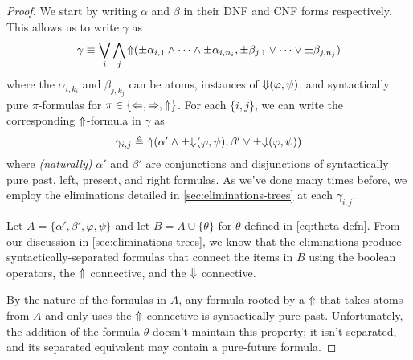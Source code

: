 \documentclass[a4paper,UKenglish,cleveref, autoref, thm-restate, numberwithinsect]{lipics-v2021}
\def\Larrow{\ensuremath\mathord{\Leftarrow}}
\def\Rarrow{\ensuremath\mathord{\Rightarrow}}
\def\Uarrow{\ensuremath\mathord{\Uparrow}}
\def\Darrow{\ensuremath\mathord{\Downarrow}}
\begin{document}
\begin{proof}
    We start by writing $\alpha$ and $\beta$ in their DNF and CNF forms respectively. This allows us to write $\gamma$ as
    \begin{equation*}
        \gamma \equiv \bigvee_i \bigwedge_j \Uarrow( \pm \alpha_{i, 1} \land \cdots \land \pm \alpha_{i, n_i}, \pm \beta_{j, 1} \lor \cdots \lor \pm \beta_{j, n_j})
    \end{equation*}
    where the $\alpha_{i, k_i}$ and $\beta_{j, k_j}$ can be atoms, instances of $\Darrow(\varphi, \psi)$, and syntactically pure $\pi$-formulas for $\pi \in \{\Larrow, \Rarrow, \Uarrow\}$. For each $\{i, j\}$, we can write the corresponding $\Uarrow$-formula in $\gamma$ as
    \begin{equation*}
        \gamma_{i, j} \triangleq \Uarrow(\alpha' \land \pm \Darrow(\varphi, \psi), \beta' \lor \pm \Darrow(\varphi, \psi))
    \end{equation*}
    where \textit{(naturally)} $\alpha'$ and $\beta'$ are conjunctions and disjunctions of syntactically pure past, left, present, and right formulas. As we've done many times before, we employ the eliminations detailed in \cref{sec:eliminations-trees} at each $\gamma_{i, j}$.

    Let $A = \{\alpha', \beta', \varphi, \psi\}$ and let $B = A \cup \{\theta\}$ for $\theta$ defined in \cref{eq:theta-defn}. From our discussion in \cref{sec:eliminations-trees}, we know that the eliminations produce syntactically-separated formulas that connect the items in $B$ using the boolean operators, the $\Uarrow$ connective, and the $\Darrow$ connective.

    By the nature of the formulas in $A$, any formula rooted by a $\Uarrow$ that takes atoms from $A$ and only uses the $\Uarrow$ connective is syntactically pure-past. Unfortunately, the addition of the formula $\theta$ doesn't maintain this property; it isn't separated, and its separated equivalent may contain a pure-future formula.


\end{proof}
\end{document}
